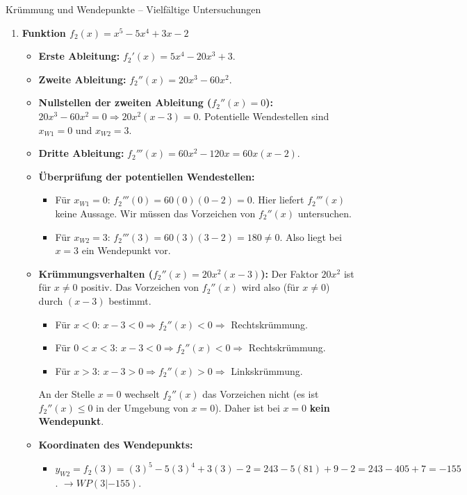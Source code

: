 \begin{loesungsumgebung}{Krümmung und Wendepunkte – Vielfältige Untersuchungen}
\begin{enumerate}[label=(\alph*)]
    \item \textbf{Funktion $f_2(x) = x^5 - 5x^4 + 3x - 2$}
    \begin{itemize}
        \item \textbf{Erste Ableitung:} $f_2'(x) = 5x^4 - 20x^3 + 3$.
        \item \textbf{Zweite Ableitung:} $f_2''(x) = 20x^3 - 60x^2$.
        \item \textbf{Nullstellen der zweiten Ableitung ($f_2''(x)=0$):}
        $20x^3 - 60x^2 = 0 \Rightarrow 20x^2(x-3) = 0$.
        Potentielle Wendestellen sind $x_{W1} = 0$ und $x_{W2} = 3$.
        \item \textbf{Dritte Ableitung:} $f_2'''(x) = 60x^2 - 120x = 60x(x-2)$.
        \item \textbf{Überprüfung der potentiellen Wendestellen:}
        \begin{itemize}
            \item Für $x_{W1} = 0$: $f_2'''(0) = 60(0)(0-2) = 0$. Hier liefert $f_2'''(x)$ keine Aussage. Wir müssen das Vorzeichen von $f_2''(x)$ untersuchen.
            \item Für $x_{W2} = 3$: $f_2'''(3) = 60(3)(3-2) = 180 \neq 0$. Also liegt bei $x=3$ ein Wendepunkt vor.
        \end{itemize}
        \item \textbf{Krümmungsverhalten ($f_2''(x) = 20x^2(x-3)$):}
        Der Faktor $20x^2$ ist für $x \neq 0$ positiv. Das Vorzeichen von $f_2''(x)$ wird also (für $x \neq 0$) durch $(x-3)$ bestimmt.
        \begin{itemize}
            \item Für $x < 0$: $x-3 < 0 \Rightarrow f_2''(x) < 0 \Rightarrow$ Rechtskrümmung.
            \item Für $0 < x < 3$: $x-3 < 0 \Rightarrow f_2''(x) < 0 \Rightarrow$ Rechtskrümmung.
            \item Für $x > 3$: $x-3 > 0 \Rightarrow f_2''(x) > 0 \Rightarrow$ Linkskrümmung.
        \end{itemize}
        An der Stelle $x=0$ wechselt $f_2''(x)$ das Vorzeichen nicht (es ist $f_2''(x) \le 0$ in der Umgebung von $x=0$). Daher ist bei $x=0$ \textbf{kein Wendepunkt}.
        \item \textbf{Koordinaten des Wendepunkts:}
        \begin{itemize}
            \item $y_{W2} = f_2(3) = (3)^5 - 5(3)^4 + 3(3) - 2 = 243 - 5(81) + 9 - 2 = 243 - 405 + 7 = -155$.
            $\rightarrow WP(3|-155)$.
        \end{itemize}
    \end{itemize}


\end{enumerate}
\end{loesungsumgebung}
